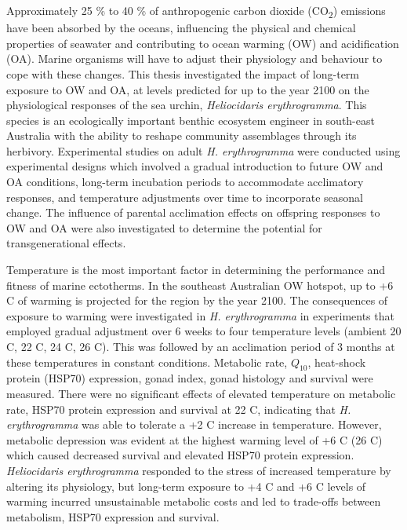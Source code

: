 \documentclass[
  oneside, 11pt, a4paper]{memoir}
\begin{document}
Approximately 25 \% to 40 \% of anthropogenic carbon dioxide (CO\textsubscript{2}) emissions have been absorbed by the oceans, influencing the physical and chemical properties of seawater and contributing to ocean warming (OW) and acidification (OA).
Marine organisms will have to adjust their physiology and behaviour to cope with these changes.
This thesis investigated the impact of long-term exposure to OW and OA, at levels predicted for up to the year 2100 on the physiological responses of the sea urchin, \textit{Heliocidaris erythrogramma}. 
This species is an ecologically important benthic ecosystem engineer in south-east Australia with the ability to reshape community assemblages through its herbivory.
Experimental studies on adult \textit{H. erythrogramma} were conducted using experimental designs which involved a gradual introduction to future OW and OA conditions,  long-term incubation periods to accommodate acclimatory responses, and temperature adjustments over time to incorporate seasonal change. The influence of parental acclimation effects on offspring responses to OW and OA were also investigated to determine the potential for transgenerational effects.

Temperature is the most important factor in determining the performance and fitness of marine ectotherms. 
In the southeast Australian OW hotspot, up to +6 \degree C of warming is projected for the region by the year 2100. 
The consequences of exposure to warming were investigated in \textit{H. erythrogramma} in experiments that employed gradual adjustment over 6 weeks to four temperature levels (ambient 20 \degree C, 22 \degree C, 24 \degree C, 26 \degree C). This was followed by an acclimation period of 3 months at these temperatures in constant conditions.
Metabolic rate, $Q_{10}$, heat-shock protein (HSP70) expression, gonad index, gonad histology and survival were measured. 
There were no significant effects of elevated temperature on metabolic rate, HSP70 protein expression and survival at 22 \degree C, indicating that \textit{H. erythrogramma} was able to tolerate a +2 \degree C increase in temperature.
However, metabolic depression was evident at the highest warming level of +6 \degree C (26 \degree C) which caused decreased survival and elevated HSP70 protein expression.
\textit{Heliocidaris erythrogramma} responded to the stress of increased temperature by altering its physiology, but long-term exposure to +4 \degree C and +6 \degree C levels of warming incurred unsustainable metabolic costs and led to trade-offs between metabolism, HSP70 expression and survival. 
\end{document}
